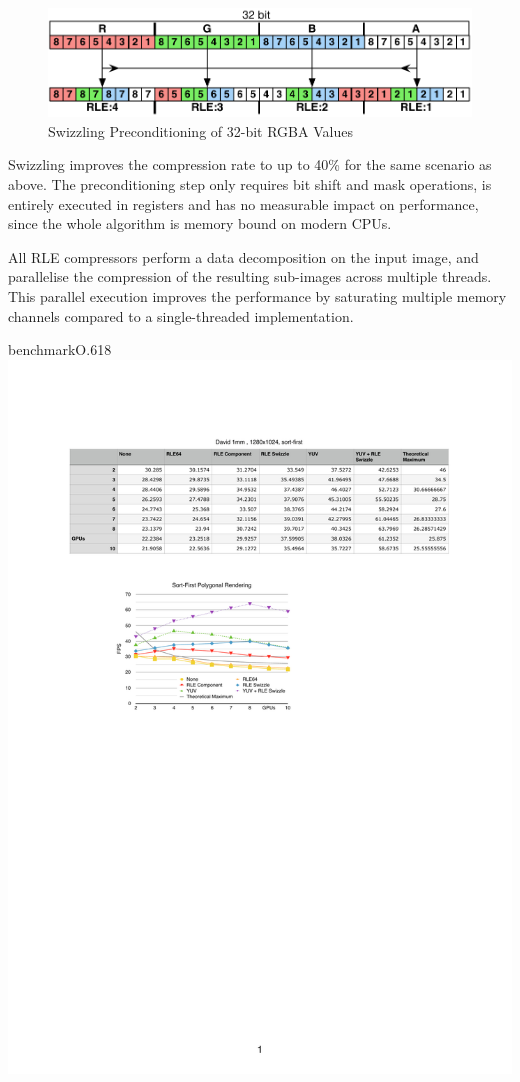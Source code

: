 \begin{figure}[h!t]
  \centering
  \includegraphics[width=\textwidth]{images/swizzle}
  \caption{Swizzling Preconditioning of 32-bit RGBA Values}
  \label{fSwizzle}
\end{figure}

Swizzling improves the compression rate to up to 40\% for the same scenario as
above. The preconditioning step only requires bit shift and mask
operations, is entirely executed in registers and has no measurable
impact on performance, since the whole algorithm is memory bound on modern CPUs.

All RLE compressors perform a data decomposition on the input image, and
parallelise the compression of the resulting sub-images across multiple
threads. This parallel execution improves the performance by saturating
multiple memory channels compared to a single-threaded implementation.

\begin{wrapfloat}{benchmark}{O}{.618\textwidth}
  \includegraphics[width=.618\textwidth]{results/rle}
  \caption{Image Compression in Sort-First Polygonal Rendering}
  \label{rRLE}
\end{wrapfloat}

